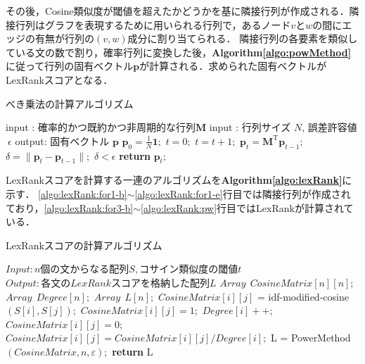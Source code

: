 その後，Cosine類似度が閾値を超えたかどうかを基に隣接行列が作成される．隣接行列はグラフを表現するために用いられる行列で，あるノード$v$と$w$の間にエッジの有無が行列の$(v,w)$成分に割り当てられる．
隣接行列の各要素を類似している文の数で割り，確率行列に変換した後，\textbf{Algorithm\ref{algo:powMethod}}に従って行列の固有ベクトル$\bm{p}$が計算される．求められた固有ベクトルがLexRankスコアとなる．
\begin{algorithm}
\caption{べき乗法の計算アルゴリズム} \label{algo:powMethod}
\begin{algorithmic}[1]
	\State input : 確率的かつ既約かつ非周期的な行列$\bm{M}$
	\State input : 行列サイズ $N$, 誤差許容値$~ \epsilon$
	\State output: 固有ベクトル $\bm{p}$
	\State $\bm{p}_{0}=  \frac{1}{N} \bm{1};$
	\State $t=0;$
	\Repeat
		\State $t=t+1;$
		\State $\bm{p}_{t} = \bm{M}^{\mathrm{T}} \bm{p}_{t-1};$
		\State $\delta = \| \bm{p}_{t} - \bm{p}_{t-1} \| ;$
	\Until $ \delta < \epsilon$
	\State \textbf{return} $\bm{p}_{t};$
\end{algorithmic}
\end{algorithm}

LexRankスコアを計算する一連のアルゴリズムを\textbf{Algorithm\ref{algo:lexRank}}に示す．
\ref{algo:lexRank:for1-b}$\sim$\ref{algo:lexRank:for1-e}行目では隣接行列が作成されており，\ref{algo:lexRank:for3-b}$\sim$\ref{algo:lexRank:pw}行目ではLexRankが計算されている．
\begin{algorithm}
\caption{LexRankスコアの計算アルゴリズム} \label{algo:lexRank}
\begin{algorithmic}[1]
	\State $Input: n 個の文からなる配列 S, コサイン類似度の閾値 t$
	\State $Output: 各文のLexRankスコアを格納した配列L$
	\State $Array ~~ CosineMatrix[n][n];$
	\State $Array ~~ Degree[n];$
	\State $Array ~~ L[n];$
	 \label{algo:lexRank:for1-b}
	 	\label{algo:lexRank:for2-b}
			\State $CosineMatrix[i][j]$ = idf-modified-cosine$(S[i], S[j]);$\label{algo:lexRank:cos}
				\State $CosineMatrix[i][j] = 1;$
				\State $Degree[i]++;$
			\Else
			 	\State $CosineMatrix[i][j] = 0;$
			\EndIf
		\EndFor\label{algo:lexRank:for2-e}
	 \EndFor\label{algo:lexRank:for1-e}
        \label{algo:lexRank:for3-b}
    		\label{algo:lexRank:for4-b}
         		\State $CosineMatrix[i][j] = CosineMatrix[i][j] / Degree[i];$
    		\EndFor\label{for4}\label{algo:lexRank:for4-e}
	\EndFor\label{for3}\label{algo:lexRank:for3-e}
	\State L = PowerMethod$(CosineMatrix, n, ε);$\label{algo:lexRank:pw}
	\State \textbf{return} L
\end{algorithmic}
\end{algorithm}

